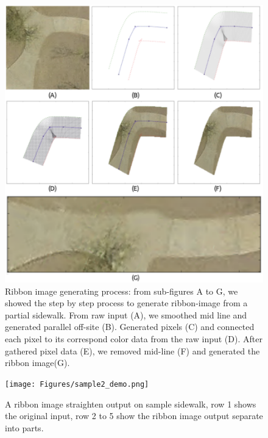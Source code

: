 \begin{figure}
    \centering
    \includegraphics[width=\textwidth]{Figures/straghten.pdf}
    \caption[Ribbon Image Generation]{Ribbon image generating process: from sub-figures A to G, we showed the step by step process to generate ribbon-image from a partial sidewalk. From raw input (A), we smoothed mid line and generated parallel off-site (B). Generated pixels (C) and connected each pixel to its correspond color data from the raw input (D). After gathered pixel data (E), we removed mid-line (F) and generated the ribbon image(G).}
    \label{fig:StraightenProcess}
\end{figure}

\begin{figure}
    \centering
    \texttt{[image: Figures/sample2\_demo.png]}
    \caption[Sample Sidewalk 2]{A ribbon image straighten output on sample sidewalk, row 1 shows the original input, row 2 to 5 show the ribbon image output separate into parts.}
    \label{fig:Sample_Sidewalk_2}
\end{figure}

